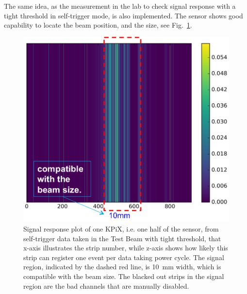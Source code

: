 \documentclass[conference]{IEEEtran}
\begin{document}
The same idea, as the measurement in the lab to check signal response with a tight threshold in self-trigger mode, is also implemented.
The sensor shows good capability to locate the beam position, and the size, see Fig.~\ref{fig:tb1}.
\begin{figure}[!ht]%
  \centering
  \includegraphics[width=0.75\linewidth]{pics/tb_1.png}
  \caption{Signal response plot of one KPiX, i.e. one half of the sensor, from self-trigger data taken in the Test Beam with tight threshold,
  that x-axis illustrates the strip number, while z-axis shows how likely this strip can register one event per data taking power cycle.
  The signal region, indicated by the dashed red line, is \SI{10}{mm} width, which is compatible with the beam size.
  The blacked out strips in the signal region are the bad channels that are manually disabled. }%
\label{fig:tb1}%
\end{figure}
\end{document}

